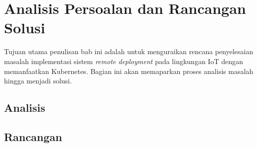\chapter{Analisis Persoalan dan Rancangan Solusi}

Tujuan utama penulisan bab ini adalah untuk menguraikan rencana penyelesaian masalah implementasi sistem \textit{remote deployment} pada lingkungan IoT dengan memanfaatkan Kubernetes. Bagian ini akan memaparkan proses analisis masalah hingga menjadi solusi.


\section{Analisis}







\section{Rancangan}





